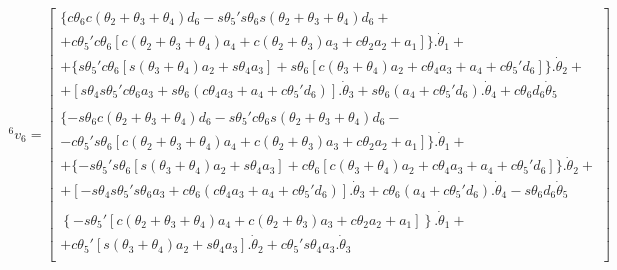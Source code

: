 \begin{equation}
    \label{eq:6v6}
\begin{gathered}
    ^6v_6 = \begin{bmatrix}
        \{c\theta_6c(\theta_2 + \theta_3 + \theta_4)d_6 - s\theta_5's\theta_6s(\theta_2 + \theta_3 + \theta_4)d_6 + \\
        +c\theta_5'c\theta_6[c(\theta_2 + \theta_3 + \theta_4)a_4 + c(\theta_2 + \theta_3)a_3 + c\theta_2a_2 + a_1]\}.\dot{\theta}_1 + \\
        +\{s\theta_5'c\theta_6[s(\theta_3+\theta_4)a_2 + s\theta_4a_3] + s\theta_6[c(\theta_3+\theta_4)a_2 + c\theta_4a_3 + a_4 + c\theta_5'd_6]\}.\dot{\theta}_2 + \\
        +[s\theta_4s\theta_5'c\theta_6a_3 + s\theta_6(c\theta_4a_3 + a_4 + c\theta_5'd_6)].\dot{\theta}_3 + s\theta_6(a_4 + c\theta_5'd_6).\dot{\theta}_4 + c\theta_6d_6\dot{\theta}_5 \\ 
        \\
        \{-s\theta_6c(\theta_2 + \theta_3 + \theta_4)d_6 - s\theta_5'c\theta_6s(\theta_2 + \theta_3 + \theta_4)d_6 - \\
        -c\theta_5's\theta_6[c(\theta_2 + \theta_3 + \theta_4)a_4 + c(\theta_2 + \theta_3)a_3 + c\theta_2a_2 + a_1]\}.\dot{\theta}_1 + \\
        +\{-s\theta_5's\theta_6[s(\theta_3+\theta_4)a_2 + s\theta_4a_3] + c\theta_6[c(\theta_3+\theta_4)a_2 + c\theta_4a_3 + a_4 + c\theta_5'd_6]\}.\dot{\theta}_2 + \\
        +[-s\theta_4s\theta_5's\theta_6a_3 + c\theta_6(c\theta_4a_3 + a_4 + c\theta_5'd_6)].\dot{\theta}_3 + c\theta_6(a_4 + c\theta_5'd_6).\dot{\theta}_4 - s\theta_6d_6\dot{\theta}_5 \\ 
        \\
        \left\{-s\theta_5'[c(\theta_2 + \theta_3 + \theta_4)a_4 + c(\theta_2 + \theta_3)a_3 + c\theta_2a_2 + a_1]\right\}.\dot{\theta}_1 + \\
        + c\theta_5'[s(\theta_3+\theta_4)a_2 + s\theta_4a_3].\dot{\theta}_2 + c\theta_5's\theta_4a_3.\dot{\theta}_3 \\ 
    \end{bmatrix}
\end{gathered}
\end{equation}

